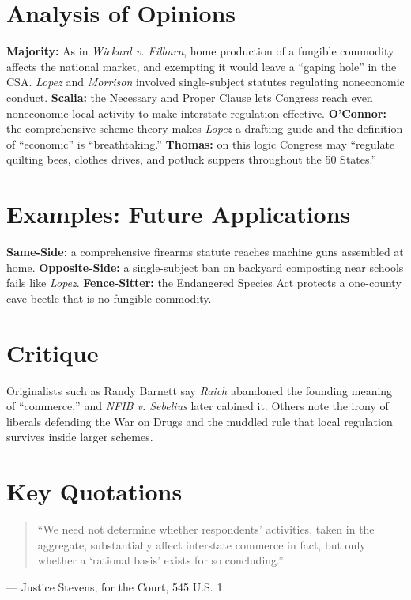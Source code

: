 \documentclass[12pt]{article}
\begin{document}
\section{Analysis of Opinions}
\textbf{Majority:} As in \textit{Wickard v. Filburn}, home production of a fungible commodity affects the national market, and exempting it would leave a ``gaping hole'' in the CSA. \textit{Lopez} and \textit{Morrison} involved single-subject statutes regulating noneconomic conduct. \textbf{Scalia:} the Necessary and Proper Clause lets Congress reach even noneconomic local activity to make interstate regulation effective. \textbf{O'Connor:} the comprehensive-scheme theory makes \textit{Lopez} a drafting guide and the definition of ``economic'' is ``breathtaking.'' \textbf{Thomas:} on this logic Congress may ``regulate quilting bees, clothes drives, and potluck suppers throughout the 50 States.''

\section{Examples: Future Applications}
\textbf{Same-Side:} a comprehensive firearms statute reaches machine guns assembled at home. \textbf{Opposite-Side:} a single-subject ban on backyard composting near schools fails like \textit{Lopez}. \textbf{Fence-Sitter:} the Endangered Species Act protects a one-county cave beetle that is no fungible commodity.

\section{Critique}
Originalists such as Randy Barnett say \textit{Raich} abandoned the founding meaning of ``commerce,'' and \textit{NFIB v. Sebelius} later cabined it. Others note the irony of liberals defending the War on Drugs and the muddled rule that local regulation survives inside larger schemes.

\section{Key Quotations}
\begin{quote}
``We need not determine whether respondents' activities, taken in the aggregate, substantially affect interstate commerce in fact, but only whether a `rational basis' exists for so concluding.''
\end{quote}
\noindent --- Justice Stevens, for the Court, 545 U.S. 1.
\end{document}
